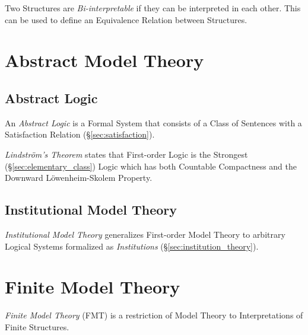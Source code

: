 Two Structures are \emph{Bi-interpretable} if they can be interpreted
in each other. This can be used to define an Equivalence Relation
between Structures.



\section{Abstract Model Theory}

\subsection{Abstract Logic}

An \emph{Abstract Logic} is a Formal System that consists of a Class
of Sentences with a Satisfaction Relation
(\S\ref{sec:satisfaction}).

\emph{Lindstr\"om's Theorem} states that First-order Logic is the
Strongest (\S\ref{sec:elementary_class}) Logic which has both
Countable Compactness and the Downward L\"owenheim-Skolem Property.



\subsection{Institutional Model Theory}

\emph{Institutional Model Theory} generalizes First-order Model Theory
to arbitrary Logical Systems formalized as \emph{Institutions}
(\S\ref{sec:institution_theory}).



\section{Finite Model Theory}

\emph{Finite Model Theory} (FMT) is a restriction of Model Theory to
Interpretations of Finite Structures.


